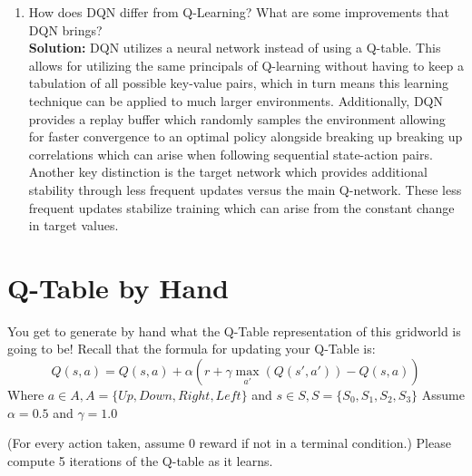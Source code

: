 \documentclass{exam}
\begin{document}
\begin{enumerate}
    \item How does DQN differ from Q-Learning? What are some improvements that DQN brings?\\
        \textbf{Solution:} DQN utilizes a neural network instead of using a Q-table. This allows for utilizing the same principals of Q-learning without having to keep a tabulation of all possible key-value pairs, which in turn means this learning technique can be applied to much larger environments. Additionally, DQN provides a replay buffer which randomly samples the environment allowing for faster convergence to an optimal policy alongside breaking up breaking up correlations which can arise when following sequential state-action pairs.\\

        Another key distinction is the target network which provides additional stability through less frequent updates versus the main Q-network. These less frequent updates stabilize training which can arise from the constant change in target values.
\end{enumerate}
\newpage
\section{Q-Table by Hand}
You get to generate by hand what the Q-Table representation of this gridworld is going to be! Recall that the formula for updating your Q-Table is:
\begin{equation*}
    Q(s,a) = Q(s,a) + \alpha(r + \gamma \max_{a'}(Q(s',a')) - Q(s,a))
\end{equation*}
Where $a \in A, A = \{Up, Down, Right, Left\}$ and $s \in S, S = \{S_0, S_1, S_2, S_3\}$
Assume $\alpha = 0.5$ and $\gamma = 1.0$

(For every action taken, assume 0 reward if not in a terminal condition.)
Please compute 5 iterations of the Q-table as it learns.

\begin{figure}[h]
\centering
{} %
\end{figure}
\end{document}
